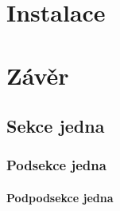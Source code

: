 \documentclass[a4paper, 12pt]{report}
\begin{document}
\chapter{Instalace}
\blindtext[1]
%
\chapter{Závěr}
\blindtext[1]
%
\section{Sekce jedna}
\subsection{Podsekce jedna}
\subsubsection{Podpodsekce jedna}

\blindtext[1]

\begin{flushleft}
    
    
\end{flushleft}
\end{document}
